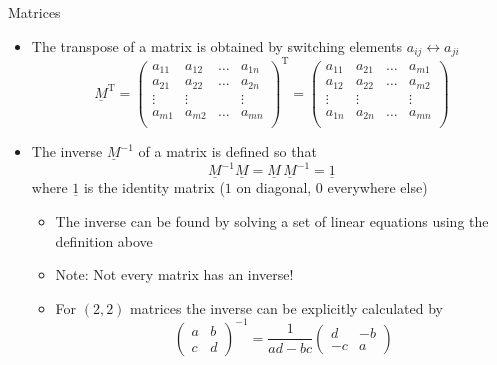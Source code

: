   \begin{frame}{Matrices}
    \begin{itemize}
      \item The transpose of a matrix is obtained by switching
        elements $a_{ij}\leftrightarrow a_{ji}$
        \begin{equation*}
          \underline{M}^\mathrm{T} =
          \begin{pmatrix}
            a_{11} & a_{12} & \dots & a_{1n} \\
            a_{21} & a_{22} & \dots & a_{2n} \\
            \vdots & \vdots &  & \vdots \\
            a_{m1} & a_{m2} & \dots & a_{mn} \\
          \end{pmatrix}^\mathrm{T} =
          \begin{pmatrix}
            a_{11} & a_{21} & \dots & a_{m1} \\
            a_{12} & a_{22} & \dots & a_{m2} \\
            \vdots & \vdots &  & \vdots \\
            a_{1n} & a_{2n} & \dots & a_{mn} \\
          \end{pmatrix}
        \end{equation*}
      \item The inverse $\underline{M}^{-1}$ of a matrix is defined so that
        \begin{equation*}
          \underline{M}^{-1}\underline{M} =
          \underline{M}\,\underline{M}^{-1} = \underline{1}
        \end{equation*}
        where $\underline{1}$ is the identity matrix
        ($1$ on diagonal, $0$ everywhere else)
        \begin{itemize}
          \item The inverse can be found by solving a set of linear equations
            using the definition above
          \item Note: Not every matrix has an inverse!
          \item For $(2,2)$ matrices the inverse can be explicitly calculated by
            \begin{equation}
              \begin{pmatrix} a & b \\ c & d \end{pmatrix}^{-1} =
              \frac{1}{ad-bc}
                \begin{pmatrix} d & -b \\ -c & a \end{pmatrix}
            \end{equation}
        \end{itemize}
    \end{itemize}
  \end{frame}

